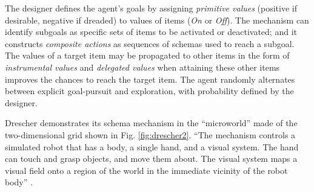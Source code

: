 \documentclass[runningheads]{llncs}
\begin{document}
The designer defines the agent's goals by assigning \textit{primitive values} (positive if desirable, negative if dreaded) to values of items (\textit{On} or \textit{Off}).
The mechanism can identify subgoals as specific sets of items to be activated or deactivated; 
and it constructs \textit{composite actions} as sequences of schemas used to reach a subgoal.
The values of a target item may be propagated to other items in the form of \textit{instrumental values} and \textit{delegated values} when attaining these other items improves the chances to reach the target item. 
The agent randomly alternates between explicit goal-pursuit and exploration, with probability defined by the designer.





Drescher demonstrates its schema mechanism in the ``microworld'' made of the two-dimensional grid shown in Fig. \ref{fig:drescher2}.
``The mechanism controls a simulated robot that has a body, a single hand, and a visual system. 
The hand can touch and grasp objects, and move them about.
The visual system maps a visual field onto a region of the world in the immediate vicinity of the robot body'' \cite[p. 114]{drescher_made-up_1991}. 
\end{document}
